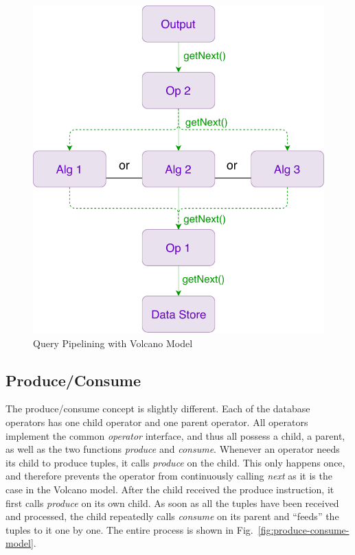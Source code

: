 
\begin{figure}[h]
	\centering
	\includegraphics[height=0.6\linewidth]{figures/volcano-model}
	\caption{Query Pipelining with Volcano Model}
	\label{fig:volcano-model}
\end{figure}

\subsection{Produce/Consume}
The produce/consume concept is slightly different. Each of the database operators has one child operator and one parent operator. All operators implement the common \textit{operator} interface, and thus all possess a child, a parent, as well as the two functions \textit{produce} and \textit{consume}. Whenever an operator needs its child to produce tuples, it calls \textit{produce} on the child. This only happens once, and therefore prevents the operator from continuously calling \textit{next} as it is the case in the Volcano model. After the child received the produce instruction, it first calls \textit{produce} on its own child. As soon as all the tuples have been received and processed, the child repeatedly calls \textit{consume} on its parent and ``feeds'' the tuples to it one by one. The entire process is shown in Fig.~\ref{fig:produce-consume-model}. %

